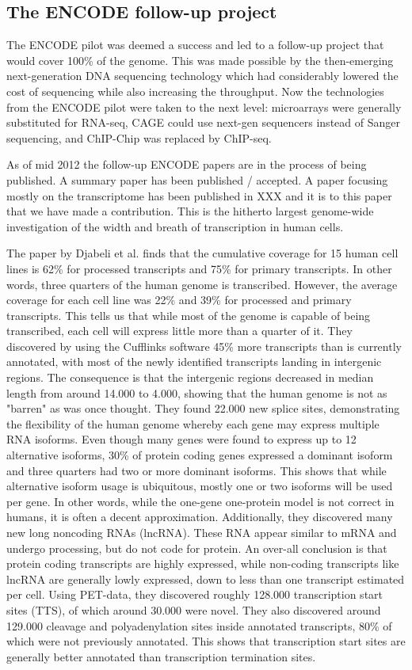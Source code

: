 \subsection{The ENCODE follow-up project}
The ENCODE pilot was deemed a success and led to a follow-up project that would
cover 100\% of the genome. This was made possible by the then-emerging
next-generation DNA sequencing technology which had considerably lowered the
cost of sequencing while also increasing the throughput. Now the technologies
from the ENCODE pilot were taken to the next level: microarrays were generally
substituted for RNA-seq, CAGE could use next-gen sequencers instead of Sanger
sequencing, and ChIP-Chip was replaced by ChIP-seq.

As of mid 2012 the follow-up ENCODE papers are in the process of being
published. A summary paper has been published / accepted. A paper focusing
mostly on the transcriptome has been published in XXX and it is to this paper
that we have made a contribution. This is the hitherto largest genome-wide
investigation of the width and breath of transcription in human cells.

The paper by Djabeli et al. finds that the cumulative coverage for 15 human
cell lines is 62\% for processed transcripts and 75\% for primary transcripts.
In other words, three quarters of the human genome is transcribed. However, the
average coverage for each cell line was 22\% and 39\% for processed and primary
transcripts. This tells us that while most of the genome is capable of being
transcribed, each cell will express little more than a quarter of it. They
discovered by using the Cufflinks software 45\% more transcripts than is
currently annotated, with most of the newly identified transcripts landing in
intergenic regions. The consequence is that the intergenic regions decreased in
median length from around 14.000 to 4.000, showing that the human genome is not
as "barren" as was once thought. They found 22.000 new splice sites,
demonstrating the flexibility of the human genome whereby each gene may express
multiple RNA isoforms. Even though many genes were found to express up to 12
alternative isoforms, 30\% of protein coding genes expressed a dominant isoform
and three quarters had two or more dominant isoforms. This shows that while
alternative isoform usage is ubiquitous, mostly one or two isoforms will be
used per gene. In other words, while the one-gene one-protein model is not
correct in humans, it is often a decent approximation. Additionally, they
discovered many new long noncoding RNAs (lncRNA). These RNA appear similar to
mRNA and undergo processing, but do not code for protein. An over-all
conclusion is that protein coding transcripts are highly expressed, while
non-coding transcripts like lncRNA are generally lowly expressed, down to less
than one transcript estimated per cell. Using PET-data, they discovered roughly
128.000 transcription start sites (TTS), of which around 30.000 were novel.
They also discovered around 129.000 cleavage and polyadenylation sites inside
annotated transcripts, 80\% of which were not previously annotated. This shows
that transcription start sites are generally better annotated than
transcription termination sites.


